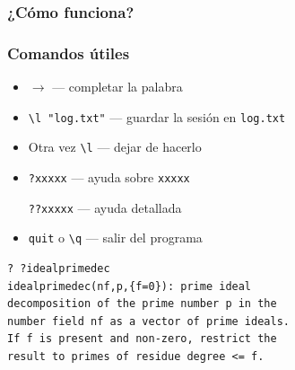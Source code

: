 \documentclass{beamer}
\begin{document}
\begin{frame}
  \frametitle{¿Cómo funciona?}

  \begin{center}\setlength{\fboxsep}{0pt}\setlength{\fboxrule}{0.5pt}
  \end{center}

\end{frame}


\begin{frame}[fragile]
  \frametitle{Comandos útiles}

  \begin{itemize}
  \item $\boxed{\rightarrow}$ --- completar la palabra

  \item \texttt{\textbackslash{}l "log.txt"} --- guardar la sesión en
    \texttt{log.txt}

  \item Otra vez \texttt{\textbackslash{}l} --- dejar de hacerlo

  \item \texttt{?xxxxx} --- ayuda sobre \texttt{xxxxx}

    \texttt{??xxxxx} --- ayuda detallada

  \item \texttt{quit} o \texttt{\textbackslash{}q} --- salir del programa
  \end{itemize}

  \begin{shaded}\small
\begin{verbatim}
? ?idealprimedec
idealprimedec(nf,p,{f=0}): prime ideal 
decomposition of the prime number p in the 
number field nf as a vector of prime ideals. 
If f is present and non-zero, restrict the 
result to primes of residue degree <= f.
\end{verbatim}
\end{shaded}
\end{frame}
\end{document}
